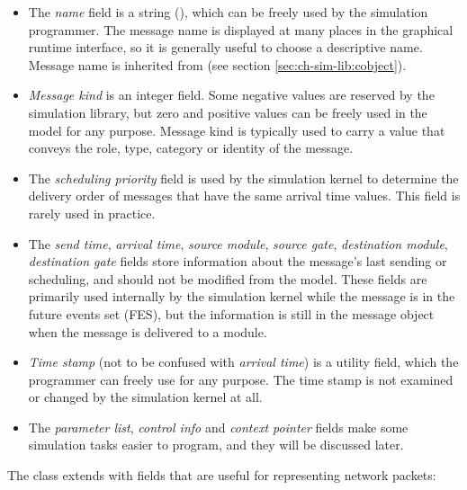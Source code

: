 \begin{itemize}
  \item The \textit{name} field is a string (),
    which can be freely used by the simulation programmer. The message
    name is displayed at many places in the graphical runtime interface,
    so it is generally useful to choose a descriptive name. Message name
    is inherited from  (see section
    \ref{sec:ch-sim-lib:cobject}).
  \item \textit{Message kind} is an integer field.
    Some negative values are reserved by the simulation library, but zero
    and positive values can be freely used in the model for any purpose.
    Message kind is typically used to carry a value that conveys the
    role, type, category or identity of the message.
  \item The \textit{scheduling priority} field is used by the simulation
    kernel to determine the delivery order of messages that have the same
    arrival time values. This field is rarely used in practice.
  \item The \textit{send time}, \textit{arrival time}, \textit{source module},
    \textit{source gate}, \textit{destination module}, \textit{destination gate}
    fields store information about the message's last sending or scheduling,
    and should not be modified from the model. These fields are primarily
    used internally by the simulation kernel while the message is in the
    future events set (FES), but the information is still in
    the message object when the message is delivered to a module.
  \item \textit{Time stamp} (not to be confused with \textit{arrival time})
    is a utility field, which the programmer can freely use for any purpose.
    The time stamp is not examined or changed by the simulation kernel at all.
  \item The \textit{parameter list}, \textit{control info} and
    \textit{context pointer} fields make some simulation tasks easier
    to program, and they will be discussed later.
\end{itemize}

The  class extends  with fields that are
useful for representing network packets:

